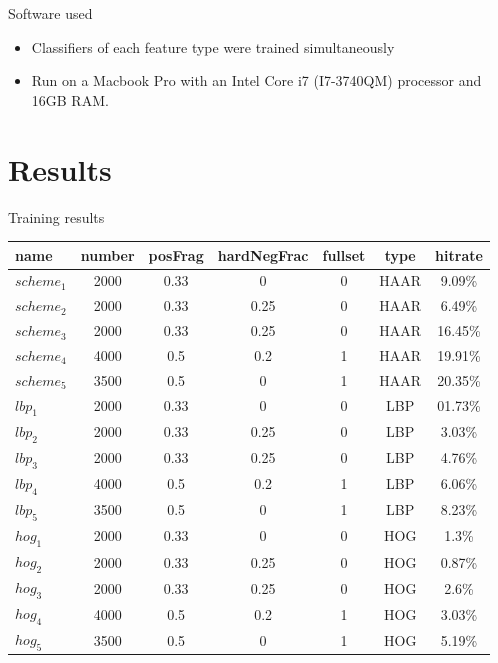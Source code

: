 \documentclass{beamer}
\begin{document}
\begin{frame}{Software used}
	\begin{itemize}
		\item Classifiers of each feature type were trained simultaneously
		\item Run on a Macbook Pro with an Intel Core i7 (I7-3740QM) processor and 16GB RAM.
	\end{itemize}
\end{frame}


\section{Results}


\begin{frame}{Training results}
	\begin{table}[H]
		\footnotesize
		\centering
		\begin{tabularx}{\textwidth}{lcccccc}
			\toprule
			\textbf{name} & \textbf{number} & \textbf{posFrag} & \textbf{hardNegFrac} & \textbf{fullset} & \textbf{type} & \textbf{hitrate} \\
			\midrule
			\(scheme_1\) & 2000 & 0.33 & 0 & 0 & HAAR & 9.09\% \\
			\(scheme_2\) & 2000 & 0.33 & 0.25 & 0 & HAAR & 6.49\% \\
			\(scheme_3\) & 2000 & 0.33 & 0.25 & 0 & HAAR & 16.45\% \\
			\(scheme_4\) & 4000 & 0.5 & 0.2 & 1 & HAAR & 19.91\% \\
			\(scheme_5\) & 3500 & 0.5 & 0 & 1 & HAAR & 20.35\% \\
			\(lbp_1\) & 2000 & 0.33 & 0 & 0 & LBP & 01.73\% \\
			\(lbp_2\) & 2000 & 0.33 & 0.25 & 0 & LBP & 3.03\% \\
			\(lbp_3\) & 2000 & 0.33 & 0.25 & 0 & LBP & 4.76\% \\
			\(lbp_4\) & 4000 & 0.5 & 0.2 & 1 & LBP & 6.06\% \\
			\(lbp_5\) & 3500 & 0.5 & 0 & 1 & LBP & 8.23\% \\
			\(hog_1\) & 2000 & 0.33 & 0 & 0 & HOG & 1.3\% \\
			\(hog_2\) & 2000 & 0.33 & 0.25 & 0 & HOG & 0.87\% \\
			\(hog_3\) & 2000 & 0.33 & 0.25 & 0 & HOG & 2.6\% \\
			\(hog_4\) & 4000 & 0.5 & 0.2 & 1 & HOG & 3.03\% \\
			\(hog_5\) & 3500 & 0.5 & 0 & 1 & HOG & 5.19\% \\
			\bottomrule
		\end{tabularx}
	\end{table}
\end{frame}
\end{document}
